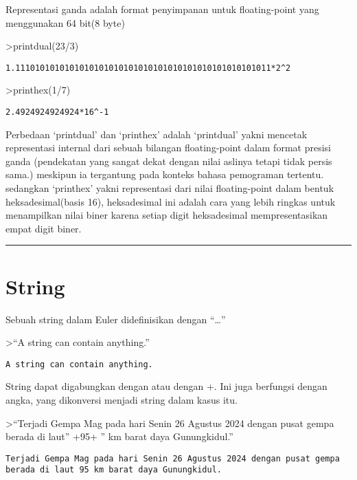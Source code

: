 \documentclass[
]{book}
\begin{document}
Representasi ganda adalah format penyimpanan untuk floating-point yang menggunakan 64 bit(8 byte)

\textgreater printdual(23/3)

\begin{verbatim}
1.1110101010101010101010101010101010101010101010101011*2^2
\end{verbatim}

\textgreater printhex(1/7)

\begin{verbatim}
2.4924924924924*16^-1
\end{verbatim}

Perbedaan `printdual' dan `printhex' adalah `printdual' yakni mencetak representasi internal dari sebuah bilangan floating-point dalam format presisi ganda (pendekatan yang sangat dekat dengan nilai aslinya tetapi tidak persis sama.) meskipun ia tergantung pada konteks bahasa pemograman tertentu. sedangkan `printhex' yakni representasi dari nilai floating-point dalam bentuk heksadesimal(basis 16), heksadesimal ini adalah cara yang lebih ringkas untuk menampilkan nilai biner karena setiap digit heksadesimal mempresentasikan empat digit biner.

\begin{center}\rule{0.5\linewidth}{0.5pt}\end{center}

\section{String}\label{string}

Sebuah string dalam Euler didefinisikan dengan ``\ldots{}''

\textgreater{}``A string can contain anything.''

\begin{verbatim}
A string can contain anything.
\end{verbatim}

String dapat digabungkan dengan \textbar{} atau dengan +. Ini juga berfungsi dengan angka, yang dikonversi menjadi string dalam kasus itu.

\textgreater{}``Terjadi Gempa Mag pada hari Senin 26 Agustus 2024 dengan pusat gempa berada di laut'' +95+ '' km barat daya Gunungkidul.''

\begin{verbatim}
Terjadi Gempa Mag pada hari Senin 26 Agustus 2024 dengan pusat gempa berada di laut 95 km barat daya Gunungkidul.
\end{verbatim}
\end{document}
